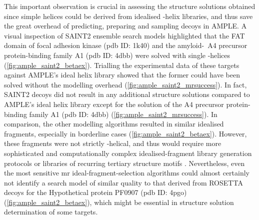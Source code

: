 This important observation is crucial in assessing the structure solutions obtained since simple helices could be derived from idealised \textalpha-helix libraries, and thus save the great overhead of predicting, preparing and sampling decoys in AMPLE. A visual inspection of SAINT2 ensemble search models highlighted that the FAT domain of focal adhesion kinase (\gls{pdb} ID: 1k40) and the amyloid-\textbeta\ A4 precursor protein-binding family A1 (\gls{pdb} ID: 4dbb) were solved with single \textalpha-helices (\cref{fig:ample_saint2_betaex}). Trialling the experimental data of these targets against AMPLE's ideal helix library \cite{Thomas2015-wu} showed that the former could have been solved without the modelling overhead (\cref{fig:ample_saint2_mrsuccess}). In fact, SAINT2 decoys did not result in any additional structure solutions compared to AMPLE's ideal helix library except for the solution of the A4 precursor protein-binding family A1 (\gls{pdb} ID: 4dbb) (\cref{fig:ample_saint2_mrsuccess}). In comparison, the other modelling algorithms resulted in similar idealised fragments, especially in borderline cases (\cref{fig:ample_saint2_betaex}). However, these fragments were not strictly \textalpha-helical, and thus would require more sophisticated and computationally complex idealised-fragment library generation protocols \cite[e.g.,][]{Jenkins2018-gf} or libraries of recurring tertiary structure motifs \cite[e.g.,][]{Sammito2013-ug}. Nevertheless, even the most sensitive \gls{mr} ideal-fragment-selection algorithms could almost certainly not identify a search model of similar quality to that derived from ROSETTA decoys for the Hypothetical protein PF0907 (\gls{pdb} ID: 4pgo) (\cref{fig:ample_saint2_betaex}), which might be essential in structure solution determination of some targets.

